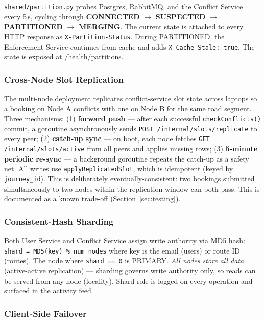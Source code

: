 \documentclass[11pt,a4paper]{article}
\begin{document}
\texttt{shared/partition.py} probes Postgres, RabbitMQ, and the Conflict Service every 5\,s, cycling through \textbf{CONNECTED} $\to$ \textbf{SUSPECTED} $\to$ \textbf{PARTITIONED} $\to$ \textbf{MERGING}. The current state is attached to every HTTP response as \texttt{X-Partition-Status}. During PARTITIONED, the Enforcement Service continues from cache and adds \texttt{X-Cache-Stale: true}. The state is exposed at /health/partitions.

\subsubsection{Cross-Node Slot Replication}
\label{sec:replication}

The multi-node deployment replicates conflict-service slot state across laptops so a booking on Node A conflicts with one on Node B for the same road segment. Three mechanisms: (1) \textbf{forward push} — after each successful \texttt{checkConflicts()} commit, a goroutine asynchronously sends \texttt{POST /internal/slots/replicate} to every peer; (2) \textbf{catch-up sync} — on boot, each node fetches \texttt{GET /internal/slots/active} from all peers and applies missing rows; (3) \textbf{5-minute periodic re-sync} — a background goroutine repeats the catch-up as a safety net. All writes use \texttt{applyReplicatedSlot}, which is idempotent (keyed by \texttt{journey\_id}). This is deliberately eventually-consistent: two bookings submitted simultaneously to two nodes within the replication window can both pass. This is documented as a known trade-off (Section~\ref{sec:testing}).

\subsubsection{Consistent-Hash Sharding}

Both User Service and Conflict Service assign write authority via MD5 hash: \texttt{shard = MD5(key) \% num\_nodes} where key is the email (users) or route ID (routes). The node where \texttt{shard == 0} is PRIMARY. \emph{All nodes store all data} (active-active replication) — sharding governs write authority only, so reads can be served from any node (locality). Shard role is logged on every operation and surfaced in the activity feed.

\subsubsection{Client-Side Failover}
\end{document}
